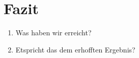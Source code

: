 \section{Fazit}
\begin{enumerate}
    \item Was haben wir erreicht?
    \item Etspricht das dem erhofften Ergebnis?
\end{enumerate}

\newpage
